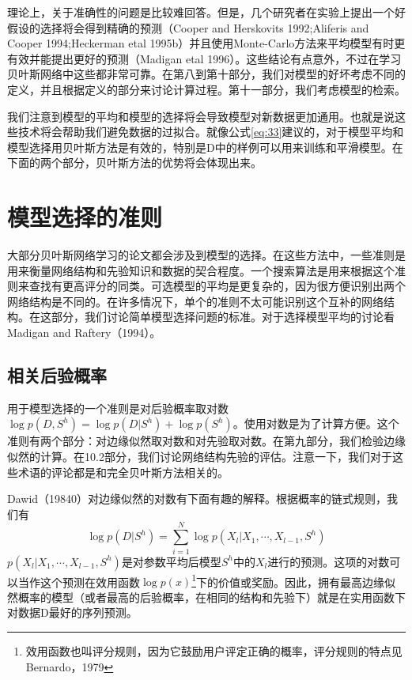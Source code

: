 \documentclass[10pt,a4paper]{article}
\begin{document}
\begin{CJK*}{UTF8}{gkai}
理论上，关于准确性的问题是比较难回答。但是，几个研究者在实验上提出一个好假设的选择将会得到精确的预测（Cooper and Herskovits 1992;Aliferis and Cooper 1994;Heckerman etal 1995b）并且使用Monte-Carlo方法来平均模型有时更有效并能提出更好的预测（Madigan etal 1996）。这些结论有点意外，不过在学习贝叶斯网络中这些都非常可靠。在第八到第十部分，我们对模型的好坏考虑不同的定义，并且根据定义的部分来讨论计算过程。第十一部分，我们考虑模型的检索。


我们注意到模型的平均和模型的选择将会导致模型对新数据更加通用。也就是说这些技术将会帮助我们避免数据的过拟合。就像公式\ref{eq:33}建议的，对于模型平均和模型选择用贝叶斯方法是有效的，特别是D中的样例可以用来训练和平滑模型。在下面的两个部分，贝叶斯方法的优势将会体现出来。


\section{模型选择的准则}
大部分贝叶斯网络学习的论文都会涉及到模型的选择。在这些方法中，一些准则是用来衡量网络结构和先验知识和数据的契合程度。一个搜索算法是用来根据这个准则来查找有更高评分的同类。可选模型的平均是更复杂的，因为很方便识别出两个网络结构是不同的。在许多情况下，单个的准则不太可能识别这个互补的网络结构。在这部分，我们讨论简单模型选择问题的标准。对于选择模型平均的讨论看Madigan and Raftery（1994）。

\subsection{相关后验概率}
用于模型选择的一个准则是对后验概率取对数$\log p(D,S^h)=\log p(D|S^h)+\log p(S^h)$。使用对数是为了计算方便。这个准则有两个部分：对边缘似然取对数和对先验取对数。在第九部分，我们检验边缘似然的计算。在10.2部分，我们讨论网络结构先验的评估。注意一下，我们对于这些术语的评论都是和完全贝叶斯方法相关的。


Dawid（19840）对边缘似然的对数有下面有趣的解释。根据概率的链式规则，我们有
\begin{equation}
\label{eq:36}
\log p(D|S^h)=\sum_{i=1}^N \log p(X_l|X_1,\cdots,X_{l-1},S^h)
\end{equation}
$p(X_l|X_1,\cdots,X_{l-1},S^h)$是对参数平均后模型$S^h$中的$X_l$进行的预测。这项的对数可以当作这个预测在效用函数$\log p(x)$\footnote{效用函数也叫评分规则，因为它鼓励用户评定正确的概率，评分规则的特点见Bernardo，1979}下的价值或奖励。因此，拥有最高边缘似然概率的模型（或者最高的后验概率，在相同的结构和先验下）就是在实用函数下对数据D最好的序列预测。



\end{CJK*}
\end{document}
